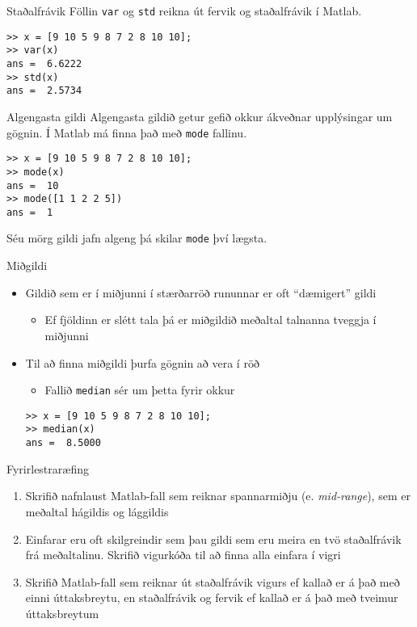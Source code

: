 \documentclass[handout]{beamer}
\begin{document}
\begin{frame}[fragile]{Staðalfrávik}
Föllin \texttt{var} og \texttt{std} reikna út fervik og staðalfrávik í Matlab.
\begin{verbatim}
>> x = [9 10 5 9 8 7 2 8 10 10];
>> var(x)
ans =  6.6222
>> std(x)
ans =  2.5734
\end{verbatim}
\end{frame}

\begin{frame}[fragile]{Algengasta gildi}
Algengasta gildið getur gefið okkur ákveðnar upplýsingar um gögnin. Í Matlab má finna það með \texttt{mode} fallinu.
\begin{verbatim}
>> x = [9 10 5 9 8 7 2 8 10 10];
>> mode(x)
ans =  10
>> mode([1 1 2 2 5])
ans =  1
\end{verbatim}
Séu mörg gildi jafn algeng þá skilar \texttt{mode} því lægsta.
\end{frame}

\begin{frame}[fragile]{Miðgildi}
\begin{itemize}
 \item Gildið sem er í miðjunni í stærðarröð rununnar er oft ``dæmigert'' gildi
 \begin{itemize}
  \item Ef fjöldinn er slétt tala þá er miðgildið meðaltal talnanna tveggja í miðjunni
 \end{itemize}
 \item Til að finna miðgildi þurfa gögnin að vera í röð
 \begin{itemize}
  \item Fallið \texttt{median} sér um þetta fyrir okkur
 \end{itemize}
\begin{verbatim}
>> x = [9 10 5 9 8 7 2 8 10 10];
>> median(x)
ans =  8.5000
\end{verbatim}
\end{itemize}
\end{frame}

\begin{frame}{Fyrirlestraræfing}
    \begin{enumerate}
        \item Skrifið nafnlaust Matlab-fall sem reiknar spannarmiðju (e. \emph{mid-range}), sem er meðaltal hágildis og lággildis
        \item Einfarar eru oft skilgreindir sem þau gildi sem eru meira en tvö staðalfrávik frá meðaltalinu. Skrifið vigurkóða til að finna alla einfara í vigri
        \item Skrifið Matlab-fall sem reiknar út staðalfrávik vigurs ef kallað er á það með einni úttaksbreytu, en staðalfrávik og fervik ef kallað er á það með tveimur úttaksbreytum
    \end{enumerate}
\end{frame}
\end{document}
